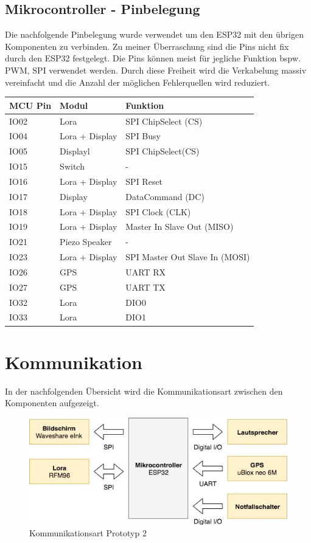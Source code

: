 \documentclass[11pt,english,german]{report}
\theoremstyle{definition}
\begin{document}
\newpage
\subsection{Mikrocontroller - Pinbelegung}
Die nachfolgende Pinbelegung wurde verwendet um den ESP32 mit den übrigen Komponenten zu verbinden. Zu meiner Überraschung sind die Pins nicht fix durch den ESP32 festgelegt. Die Pins können meist für jegliche Funktion bspw. PWM, SPI verwendet werden. Durch diese Freiheit wird die Verkabelung massiv vereinfacht und die Anzahl der möglichen Fehlerquellen wird reduziert.\\
\begin{tabularx}{\textwidth}{ l|l|X }
	\textbf{MCU Pin} & \textbf{Modul} & \textbf{Funktion}\\ \hline
	IO02 & Lora & SPI ChipSelect (CS)\\\hline
	IO04 & Lora + Display& SPI Busy\\ \hline
	IO05 & Displayl& SPI ChipSelect(CS)\\\hline
	IO15 & Switch & -\\ \hline
	IO16 & Lora + Display & SPI Reset\\\hline
	IO17 & Display&  DataCommand (DC)\\ \hline
	IO18 & Lora + Display & SPI Clock (CLK)\\ \hline
	IO19 & Lora + Display & Master In Slave Out (MISO) \\\hline
	IO21 & Piezo Speaker & - \\ \hline
	IO23 & Lora + Display & SPI Master Out Slave In (MOSI) \\\hline
	IO26 & GPS & UART RX\\ \hline
	IO27 & GPS & UART TX\\ \hline
	IO32 & Lora & DIO0\\ \hline
	IO33 & Lora & DIO1\\ \hline
\end{tabularx}

\newpage
\section{Kommunikation}
In der nachfolgenden Übersicht wird die Kommunikationsart zwischen den Komponenten aufgezeigt.\\
\begin{figure}[H]
	\centering
	\includegraphics[width=\textwidth]{img/system/ATASNode2_Kommunikation.jpg}
	\caption[Kommunikationsart Prototyp 2]
	{Kommunikationsart Prototyp 2}
\end{figure}
\end{document}
